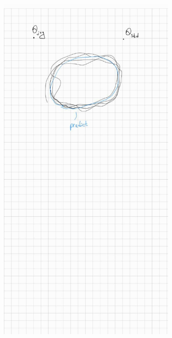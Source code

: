 \documentclass[referee, pdflatex, sn-mathphys-num]{sn-jnl}
\theoremstyle{definition}
\theoremstyle{plain}
\begin{document}
	\begin{figure}[h]
		\centering
		\includegraphics[width=0.8\textwidth]{imgs/photo_2_2024-12-13_23-46-45}
	\end{figure}
	
\end{document}
